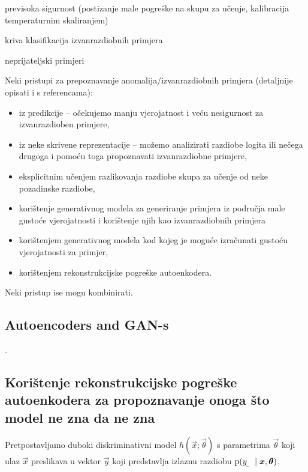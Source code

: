 \documentclass{article}
\begin{document}
previsoka sigurnost (postizanje male pogreške na skupu za učenje, kalibracija temperaturnim skaliranjem)

kriva klasifikacija izvanrazdiobnih primjera

neprijateljski primjeri

\citep{Hendrycks:2016:BDMOODE}

\citep{Guo:2017:CMNN}

\citep{Lee:2017:TCCCDOOD}

\citep{Liang:2017:PDOODENN}

Neki pristupi za prepoznavanje anomalija/izvanrazdiobnih primjera (detaljnije opisati i s referencama):
\begin{itemize}
    \item iz predikcije -- očekujemo manju vjerojatnost i veću nesigurnost za izvanrazdioben primjere,
    \item iz neke skrivene reprezentacije -- možemo analizirati razdiobe logita ili nečega drugoga i pomoću toga propoznavati izvanrazdiobne primjere,
    \item eksplicitnim učenjem razlikovanja razdiobe skupa za učenje od neke pozadinske razdiobe,
    \item korištenje generativnog modela za generiranje primjera iz područja male gustoće vjerojatnosti i korištenje njih kao izvanrazdiobnih primjera
    \item korištenjem generativnog modela kod kojeg je moguće izračunati gustoću vjerojatnosti za primjer,
    \item korištenjem rekonstrukcijske pogreške autoenkodera.
\end{itemize}
Neki pristup ise mogu kombinirati.


\subsection{Autoencoders and GAN-s}

.


\subsection{Korištenje rekonstrukcijske pogreške autoenkodera za propoznavanje onoga što model ne zna da ne zna}

Pretpostavljamo duboki diskriminativni model $h(\vec x;\vec\theta)$ s parametrima $\vec\theta$ koji ulaz $\vec x$ preslikava u vektor $\vec y$ koji predstavlja izlaznu razdiobu  $\p(\rvar y\mid \vec x, \vec\theta)$.
\end{document}

